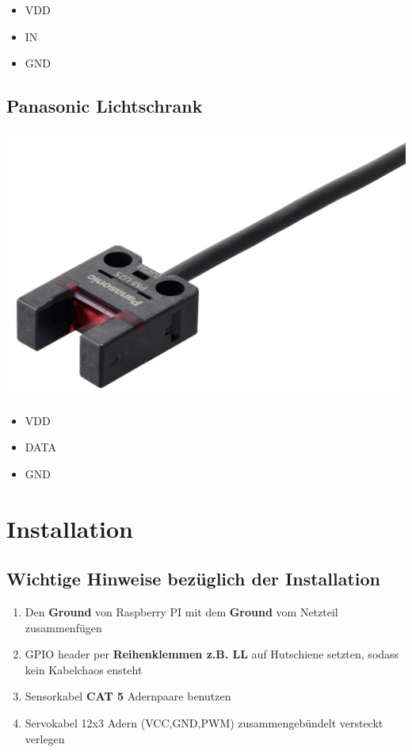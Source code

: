\documentclass[12pt,letterpaper]{article}
\begin{document}
	\begin{itemize}
	\item VDD
	\item IN
	\item GND
	\end{itemize}
	
	\subsection{Panasonic Lichtschrank}

	\begin{center}
	\includegraphics[scale=0.1]{lichtschranke}
	\end{center}
	
	\begin{itemize}
	\item VDD
	\item DATA
	\item GND
	\end{itemize}
	
	\newpage
	
	\section{Installation}	
	
	\subsection{Wichtige Hinweise bezüglich der Installation}
	
	\begin{enumerate}
	\item Den \textbf{Ground} von Raspberry PI mit dem \textbf{Ground} vom Netzteil zusammenfügen
	\item GPIO header per \textbf{Reihenklemmen z.B. LL} auf Hutschiene setzten, sodass kein Kabelchaos ensteht
	\item Sensorkabel \textbf{CAT 5} Adernpaare benutzen	
	\item Servokabel 12x3 Adern (VCC,GND,PWM) zusammengebündelt versteckt verlegen 
	\end{enumerate}
	
\end{document}
